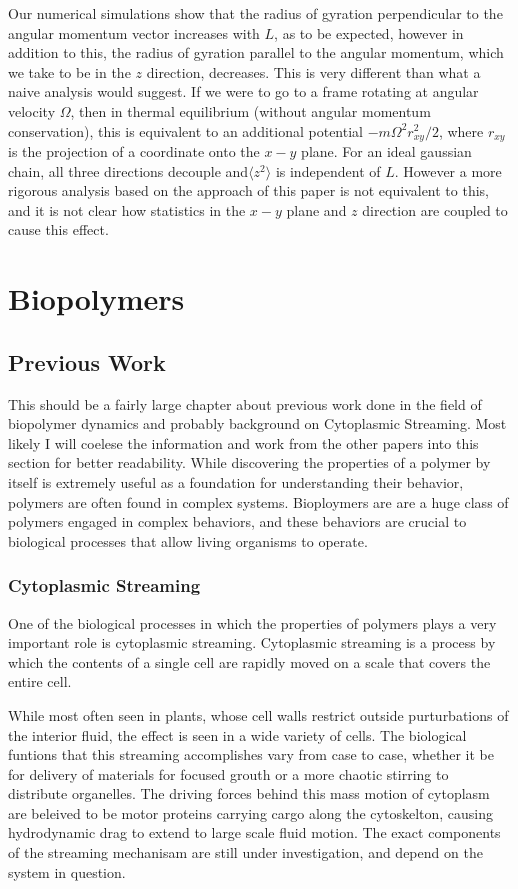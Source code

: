 \documentclass[11pt]{ucthesis}
\begin{document}
Our numerical simulations show that the radius of gyration perpendicular
to the angular momentum vector increases with $L$, as to be expected,
however in addition to this, the radius of gyration parallel to the
angular momentum, which we take to be in the $z$ direction, decreases.
This is very different than what a naive analysis would suggest. If we
were to go to a frame rotating at angular velocity $\Omega$, then in
thermal equilibrium (without angular momentum conservation), this is
equivalent to an additional potential $- m \Omega^2 r^2_{xy}/2$, where
$r_{xy}$ is the projection of a coordinate onto the $x-y$ plane.  For an ideal
gaussian chain, all three directions decouple and$\langle z^2\rangle$
is independent of $L$. However a more rigorous analysis based on the
approach of this paper is not equivalent to this, and it is not clear
how statistics in the $x-y$ plane and $z$ direction are coupled to cause
this effect.


\part{Biopolymers}

\chapter{Previous Work}
This should be a fairly large chapter about previous work done in the field of biopolymer dynamics and probably background on Cytoplasmic Streaming.
Most likely I will coelese the information and work from the other papers into this section for better readability.
While discovering the properties of a polymer by itself is extremely useful as a foundation for understanding their behavior, polymers are often found in complex systems. Bioploymers are are a huge class of polymers engaged in complex behaviors, and these behaviors are crucial to biological processes that allow living organisms to operate.

\section{Cytoplasmic Streaming}
One of the biological processes in which the properties of polymers plays a very important role is cytoplasmic streaming.
Cytoplasmic streaming is a process by which the contents of a single cell are rapidly moved on a scale that covers the entire cell. 

While most often seen in plants, whose cell walls restrict outside purturbations of the interior fluid, the effect is seen in a wide variety of cells. 
The biological funtions that this streaming accomplishes vary from case to case, whether it be for delivery of materials for focused grouth or a more chaotic stirring to distribute organelles.
The driving forces behind this mass motion of cytoplasm are beleived to be motor proteins carrying cargo along the cytoskelton, causing hydrodynamic drag to extend to large scale fluid motion.
The exact components of the streaming mechanisam are still under investigation, and depend on the system in question.
\end{document}
